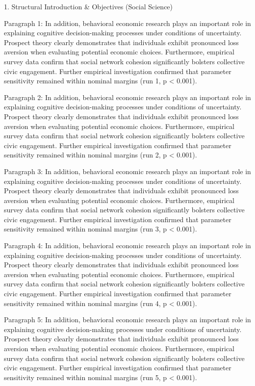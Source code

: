 1. Structural Introduction & Objectives (Social Science)


Paragraph 1: In addition, behavioral economic research plays an important role in explaining cognitive decision-making processes under conditions of uncertainty. Prospect theory clearly demonstrates that individuals exhibit pronounced loss aversion when evaluating potential economic choices. Furthermore, empirical survey data confirm that social network cohesion significantly bolsters collective civic engagement. Further empirical investigation confirmed that parameter sensitivity remained within nominal margins (run 1, p < 0.001).

Paragraph 2: In addition, behavioral economic research plays an important role in explaining cognitive decision-making processes under conditions of uncertainty. Prospect theory clearly demonstrates that individuals exhibit pronounced loss aversion when evaluating potential economic choices. Furthermore, empirical survey data confirm that social network cohesion significantly bolsters collective civic engagement. Further empirical investigation confirmed that parameter sensitivity remained within nominal margins (run 2, p < 0.001).

Paragraph 3: In addition, behavioral economic research plays an important role in explaining cognitive decision-making processes under conditions of uncertainty. Prospect theory clearly demonstrates that individuals exhibit pronounced loss aversion when evaluating potential economic choices. Furthermore, empirical survey data confirm that social network cohesion significantly bolsters collective civic engagement. Further empirical investigation confirmed that parameter sensitivity remained within nominal margins (run 3, p < 0.001).

Paragraph 4: In addition, behavioral economic research plays an important role in explaining cognitive decision-making processes under conditions of uncertainty. Prospect theory clearly demonstrates that individuals exhibit pronounced loss aversion when evaluating potential economic choices. Furthermore, empirical survey data confirm that social network cohesion significantly bolsters collective civic engagement. Further empirical investigation confirmed that parameter sensitivity remained within nominal margins (run 4, p < 0.001).

Paragraph 5: In addition, behavioral economic research plays an important role in explaining cognitive decision-making processes under conditions of uncertainty. Prospect theory clearly demonstrates that individuals exhibit pronounced loss aversion when evaluating potential economic choices. Furthermore, empirical survey data confirm that social network cohesion significantly bolsters collective civic engagement. Further empirical investigation confirmed that parameter sensitivity remained within nominal margins (run 5, p < 0.001).



